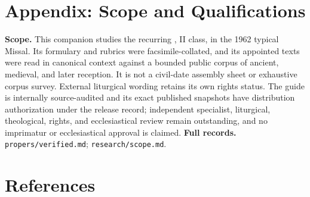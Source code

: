 \section*{Appendix: Scope and Qualifications}

\begin{studyframe}
\textbf{Scope.} This companion studies the recurring , II class, in the 1962 typical Missal. Its formulary and rubrics were facsimile-collated, and its appointed texts were read in canonical context against a bounded public corpus of ancient, medieval, and later reception. It is not a civil-date assembly sheet or exhaustive corpus survey. External liturgical wording retains its own rights status. The guide is internally source-audited and its exact published snapshots have distribution authorization under the release record; independent specialist, liturgical, theological, rights, and ecclesiastical review remain outstanding, and no imprimatur or ecclesiastical approval is claimed. \textbf{Full records.} \nolinkurl{propers/verified.md}; \nolinkurl{research/scope.md}.
\end{studyframe}

\ifdefined\TriptychSynthesisEdition\else\enlargethispage{2\baselineskip}\fi
\section*{References}

